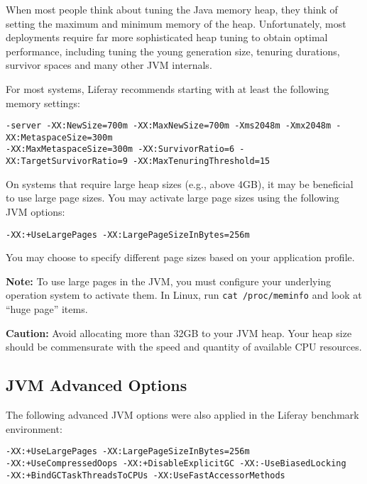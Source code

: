 When most people think about tuning the Java memory heap, they think of
setting the maximum and minimum memory of the heap. Unfortunately, most
deployments require far more sophisticated heap tuning to obtain optimal
performance, including tuning the young generation size, tenuring
durations, survivor spaces and many other JVM internals.

For most systems, Liferay recommends starting with at least the
following memory settings:

\begin{verbatim}
-server -XX:NewSize=700m -XX:MaxNewSize=700m -Xms2048m -Xmx2048m -XX:MetaspaceSize=300m
-XX:MaxMetaspaceSize=300m -XX:SurvivorRatio=6 -XX:TargetSurvivorRatio=9 -XX:MaxTenuringThreshold=15
\end{verbatim}

On systems that require large heap sizes (e.g., above 4GB), it may be
beneficial to use large page sizes. You may activate large page sizes
using the following JVM options:

\begin{verbatim}
-XX:+UseLargePages -XX:LargePageSizeInBytes=256m
\end{verbatim}

You may choose to specify different page sizes based on your application
profile.

\textbf{Note:} To use large pages in the JVM, you must configure your
underlying operation system to activate them. In Linux, run
\texttt{cat\ /proc/meminfo} and look at ``huge page'' items.

\noindent\hrulefill

\textbf{Caution:} Avoid allocating more than 32GB to your JVM heap. Your
heap size should be commensurate with the speed and quantity of
available CPU resources.

\noindent\hrulefill

\subsection{JVM Advanced Options}\label{jvm-advanced-options}

The following advanced JVM options were also applied in the Liferay
benchmark environment:

\begin{verbatim}
-XX:+UseLargePages -XX:LargePageSizeInBytes=256m 
-XX:+UseCompressedOops -XX:+DisableExplicitGC -XX:-UseBiasedLocking 
-XX:+BindGCTaskThreadsToCPUs -XX:UseFastAccessorMethods
\end{verbatim}

